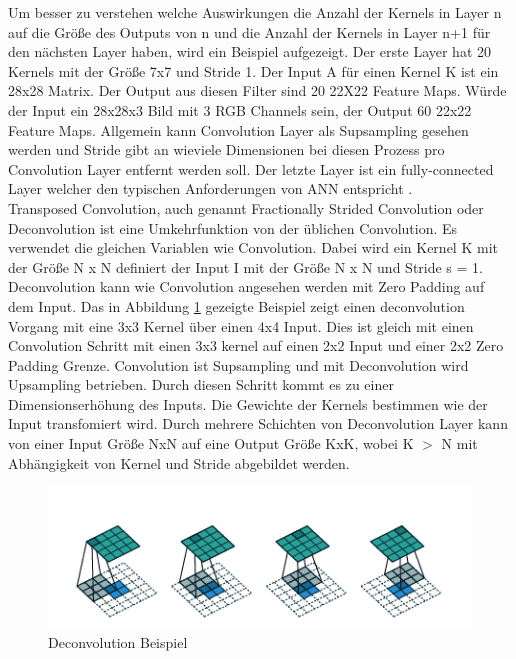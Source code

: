 \documentclass{llncs}
\begin{document}
	Um  besser zu verstehen welche Auswirkungen die Anzahl der Kernels in Layer n auf die Größe des Outputs von n und die Anzahl der Kernels in Layer n+1 für den nächsten Layer haben, wird ein Beispiel aufgezeigt. Der erste Layer hat 20 Kernels mit der Größe 7x7 und Stride 1. Der Input A für einen Kernel K ist ein 28x28 Matrix. Der Output aus diesen Filter sind 20 22X22 Feature Maps. Würde der Input ein 28x28x3 Bild mit 3 RGB Channels sein, der Output 60 22x22 Feature Maps. Allgemein kann Convolution Layer als Supsampling gesehen werden und Stride gibt an wieviele Dimensionen bei diesen Prozess pro Convolution Layer entfernt werden soll. Der letzte Layer ist ein fully-connected Layer welcher den typischen Anforderungen von ANN entspricht \cite{conv}.  
	\\
	Transposed Convolution, auch genannt Fractionally Strided Convolution oder Deconvolution ist eine Umkehrfunktion von der üblichen Convolution. Es verwendet die gleichen Variablen wie Convolution. Dabei wird ein Kernel K mit der Größe N x N definiert der Input I mit der Größe N x N und Stride s = 1. Deconvolution kann wie Convolution angesehen werden mit  Zero Padding auf dem Input.  Das in Abbildung \ref{fig:Bild4} gezeigte Beispiel zeigt einen deconvolution Vorgang mit eine 3x3 Kernel über einen 4x4 Input. Dies ist gleich mit einen Convolution Schritt mit einen 3x3 kernel auf einen 2x2 Input und einer 2x2 Zero Padding Grenze. Convolution ist Supsampling und mit Deconvolution wird Upsampling betrieben. Durch diesen Schritt kommt es zu einer Dimensionserhöhung des Inputs. Die Gewichte der Kernels bestimmen wie der Input transfomiert wird. Durch mehrere Schichten von Deconvolution Layer kann von einer Input Größe NxN auf eine Output Größe KxK, wobei K $>$ N mit Abhängigkeit von Kernel und Stride abgebildet werden\cite{conv}. 

	\begin{figure}[htbp] 
		\centering
		\includegraphics[width=1.0\textwidth]{decon.png}
		\caption{Deconvolution Beispiel}
		\label{fig:Bild4}
	\end{figure}
	\newpage
\end{document}
